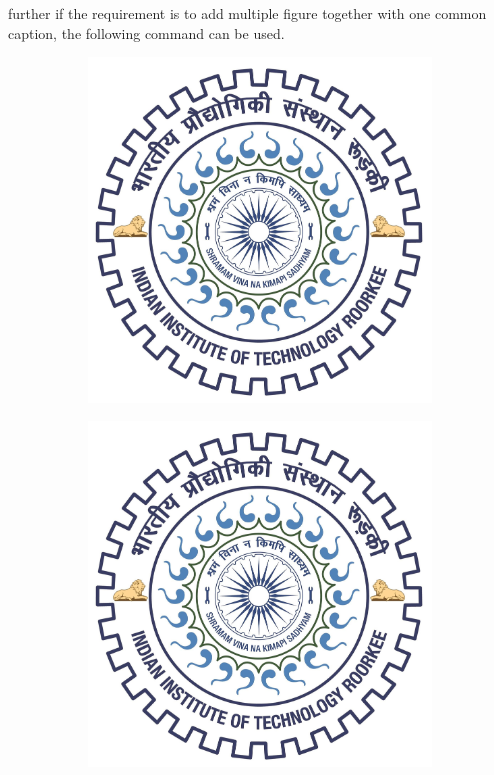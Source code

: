  further if the requirement is to add multiple figure together with one common caption, the following command can be used.
%
\begin{figure}[htb!]
	\centering
    \begin{subfigure}[b]{0.4\textwidth}
        \includegraphics[width=\linewidth]{image/iitrlogo.jpg} 
        \caption{}
        \label{Fig 1.2a}
    \end{subfigure}
	\centering
    \begin{subfigure}[b]{0.4\textwidth}
        \includegraphics[width=\linewidth]{image/iitrlogo.jpg} 

\end{subfigure}
\end{figure}
